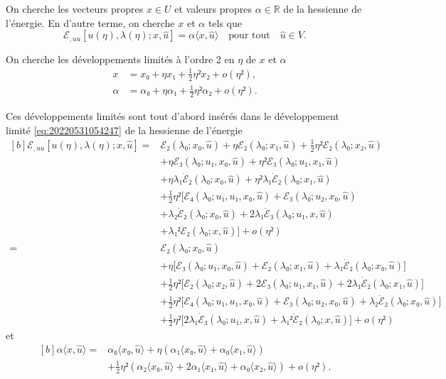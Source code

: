 \documentclass[12pt, final]{scrartcl}
\theoremstyle{definition}
\newcommand{\reals}{\mathbb{R}}
\begin{document}
On cherche les vecteurs propres \(x ∈ U\) et valeurs propres \(α ∈ \reals\) de
la hessienne de l'énergie. En d'autre terme, on cherche \(x\) et \(α\) tels que
\begin{equation}
 ℰ_{, u u} [u(η), λ(η); x, \hat{u}] = α 〈 x, \hat{u} 〉 \quad \text{pour tout} \quad \hat{u} ∈ V.
\end{equation}

On cherche les développements limités à l'ordre 2 en \(η\) de \(x\) et \(α\)
\begin{align*}
 x & = x₀ + η x₁ + \tfrac{1}{2} η² x₂ + o(η²),\\
 α & = α₀ + η α₁ + \tfrac{1}{2} η² α₂ + o(η²).
\end{align*}

Ces développements limités sont tout d'abord insérés dans le développement
limité \eqref{eq:20220531054247} de la hessienne de l'énergie
\begin{equation*}
  \begin{aligned}[b]
    ℰ_{, u u} [u(η), λ(η); x, \hat{u}]
    ={} & ℰ₂(λ₀; x₀, \hat{u}) + η ℰ₂(λ₀ ; x₁, \hat{u}) + \tfrac{1}{2} η² ℰ₂(λ₀; x₂, \hat{u})\\
    & + η ℰ₃(λ₀; u₁, x₀, \hat{u}) + η² ℰ₃(λ₀; u₁, x₁, \hat{u})\\
    & + η λ₁ \dot{ℰ}₂(λ₀; x₀, \hat{u}) + η² λ₁ \dot{ℰ}₂(λ₀; x₁, \hat{u})\\
    & + \tfrac{1}{2} η² \bigl[ℰ₄(λ₀; u₁, u₁, x₀, \hat{u}) + ℰ₃(λ₀; u₂, x₀, \hat{u})\\
    & + λ₂ \dot{ℰ}₂(λ₀; x₀, \hat{u}) + 2 λ₁ \dot{ℰ}₃(λ₀; u₁, x, \hat{u})\\
    & + λ₁² \ddot{ℰ}₂(λ₀; x, \hat{u}) \bigr] + o(η²)\\
    ={} & ℰ₂(λ₀; x₀, \hat{u})\\
    & + η \bigl[ℰ₃(λ₀; u₁, x₀, \hat{u}) + ℰ₂ (λ₀; x₁, \hat{u}) + λ₁ \dot{ℰ}₂(λ₀ ; x₀, \hat{u})\bigr]\\
    & + \tfrac{1}{2} η² \bigl[ℰ₂(λ₀; x₂, \hat{u}) + 2ℰ₃(λ₀; u₁, x₁, \hat{u}) + 2 λ₁ \dot{ℰ}₂(λ₀; x₁, \hat{u})\bigr]\\
    & + \tfrac{1}{2} η² \bigl[ℰ₄(λ₀; u₁, u₁, x₀, \hat{u}) + ℰ₃(λ₀; u₂, x₀, \hat{u}) + λ₂ \dot{ℰ}₂(λ₀; x₀, \hat{u})\bigr]\\
    & + \tfrac{1}{2} η² \bigl[2 λ₁ \dot{ℰ}₃(λ₀ ; u₁, x, \hat{u}) + λ₁² \ddot{ℰ}₂(λ₀; x, \hat{u})\bigr] + o(η²)
  \end{aligned}
\end{equation*}
et
\begin{equation*}
  \begin{aligned}[b]
    α 〈 x, \hat{u} 〉
    ={} & α₀ 〈 x₀, \hat{u} 〉 + η(α₁ 〈 x₀, \hat{u} 〉 + α₀ 〈 x₁, \hat{u} 〉)\\
    & + \tfrac{1}{2} η² (α₂ 〈 x₀, \hat{u} 〉 + 2 α₁ 〈 x₁, \hat{u} 〉 + α₀ 〈 x₂, \hat{u} 〉) + o(η²) .
  \end{aligned}
\end{equation*}
\end{document}
